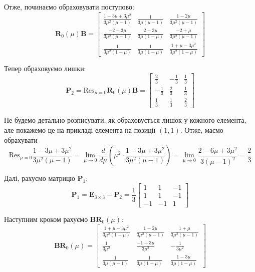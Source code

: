 \documentclass{hw_template}
\begin{document}
Отже, починаємо обраховувати поступово:
\begin{equation*}
    \boldsymbol{R}_0(\mu)\boldsymbol{B} = \begin{bmatrix}
        \frac{1-3\mu+3\mu^2}{3\mu^2(\mu-1)} & \frac{1}{3\mu(\mu-1)} & \frac{1-2\mu}{3\mu^2(\mu-1)} \\
        \frac{-2+3\mu}{3\mu^2(\mu-1)} & \frac{2-3\mu}{3\mu(1-\mu)} & \frac{-2+\mu}{3\mu^2(\mu-1)} \\
        \frac{1}{3\mu^2(1-\mu)} & \frac{1}{3\mu(1-\mu)} & \frac{1+\mu-3\mu^2}{3\mu^2(1-\mu)}
    \end{bmatrix}
\end{equation*}

Тепер обраховуємо лишки:
\begin{equation*}
    \boldsymbol{P}_2 = \text{Res}_{\mu=0}\boldsymbol{R}_0(\mu)\boldsymbol{B} = \begin{bmatrix}
        \frac{2}{3} & -\frac{1}{3} & \frac{1}{3} \\
        -\frac{1}{3} & \frac{2}{3} & \frac{1}{3} \\
        \frac{1}{3} & \frac{1}{3} & \frac{2}{3}
    \end{bmatrix}
\end{equation*}

Не будемо детально розписувати, як обраховується лишок у кожного елемента, але 
покажемо це на прикладі елемента на позиції $(1,1)$. Отже, маємо обрахувати
\begin{equation*}
    \text{Res}_{\mu=0}\frac{1-3\mu+3\mu^2}{3\mu^2(\mu-1)} 
    = \lim_{\mu \to 0} \frac{d}{d\mu}\left(\mu^2 \cdot \frac{1-3\mu+3\mu^2}{3\mu^2(\mu-1)}\right)
    = \lim_{\mu \to 0} \frac{2-6\mu+3\mu^2}{3(\mu-1)^2} = \frac{2}{3}
\end{equation*}

Далі, рахуємо матрицю $\boldsymbol{P}_1$:
\begin{equation*}
    \boldsymbol{P}_1 = \boldsymbol{E}_{3 \times 3} - \boldsymbol{P}_2 = 
    \frac{1}{3}\begin{bmatrix}
        1 & 1 & -1 \\
        1 & 1 & -1 \\
        -1 & -1 & 1
    \end{bmatrix}
\end{equation*}

Наступним кроком рахуємо $\boldsymbol{BR}_0(\mu)$:
\begin{equation*}
    \boldsymbol{BR}_0(\mu) = \begin{bmatrix}
        \frac{1+\mu-3\mu^2}{3\mu^2(1-\mu)} & \frac{1-2\mu}{3\mu^2(\mu-1)} & \frac{1+\mu}{3\mu^2(\mu-1)} \\
        \frac{1}{3\mu^2} & \frac{-1+3\mu}{3\mu^2} & -\frac{1}{3\mu^2} \\
        \frac{1}{3\mu(\mu-1)} & \frac{1}{3\mu(1-\mu)} & \frac{1-3\mu}{3\mu(1-\mu)}
    \end{bmatrix}
\end{equation*}
\end{document}
